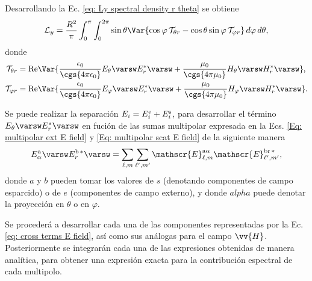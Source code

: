 Desarrollando la Ec. \eqref{eq: Ly spectral density r theta} se obtiene
%
\begin{equation}
\mathcal{L}_y = \frac{R^2}{\pi}\int_0^{\pi}\int_0^{2\pi} \sin\theta \Var{\cos\varphi \,\mathcal{T}_{\theta r} - \cos\theta\sin\varphi\,\mathcal{T}_{\varphi r}} \,d\varphi \, d\theta,
\end{equation}
% 
donde 
\begin{align}
\mathcal{T}_{\theta r} &= {\rm Re}\Var{\frac{\epsilon_0}{\cgs{4\pi\epsilon_0}} E_{\theta}\varsw E_{r}^{*}\varsw + \frac{\mu_0}{\cgs{4\pi\mu_0}} H_{\theta}\varsw H_{r}^{*}\varsw  },\\
\mathcal{T}_{\varphi r} &= {\rm Re}\Var{\frac{\epsilon_0}{\cgs{4\pi\epsilon_0}} E_{\varphi}\varsw E_{r}^{*}\varsw + \frac{\mu_0}{\cgs{4\pi\mu_0}} H_{\varphi}\varsw H_{r}^{*}\varsw  }.
\end{align}

Se puede realizar la separación $E_i=E_i^{\rm e}+E_i^{\rm s}$, para desarrollar el término $E_{\theta}\varsw E_{r}^{*}\varsw$ en fución de las sumas multipolar expresada en la Ecs. \eqref{Eq: multipolar ext E field} y \eqref{Eq: multipolar scat E field} de la siguiente manera
\begin{equation}
E^{\rm a}_{\alpha}\varsw E_{r}^{\rm b \,*}\varsw = \sum_{\ell, m} \sum_{\ell^{\prime}, m^{\prime}} \mathscr{E}_{\ell, m}^{\text{a}\alpha}\mathscr{E}_{\ell^{\prime}, m^{\prime}}^{\text{br}\,*},\label{eq: cross terms E field}
\end{equation}
donde $a$ y $b$ pueden tomar los valores de $s$ (denotando componentes de campo esparcido) o de $e$ (componentes de campo externo), y donde $alpha$ puede denotar la proyección en $\theta$ o en $\varphi$. 

Se procederá a desarrollar cada una de las componentes representadas por la Ec. \eqref{eq: cross terms E field}, así como sus análogas para el campo $\vv{H}$. Posteriormente se integrarán cada una de las expresiones obtenidas de manera analítica, para obtener una expresión exacta para la contribución espectral de cada multipolo.


